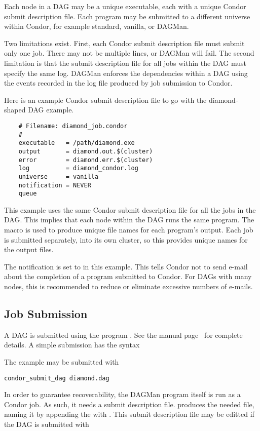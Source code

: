 Each node in a DAG may be a unique executable, each with a unique
Condor submit description file.
Each program may be submitted to a different universe
within Condor, for example standard,
vanilla, or DAGMan.

Two limitations exist.
First, each Condor submit description file must submit only one job.
There may not be multiple \verb@queue@ lines, or DAGMan will fail.
The second limitation is that
the submit description file for all jobs within the DAG
must specify the same log.
DAGMan enforces the dependencies within a DAG
using the events recorded in the
log file produced by job submission to Condor.

Here is an example Condor submit description file to go with the
diamond-shaped DAG example.

\begin{verbatim}
	# Filename: diamond_job.condor
	#
	executable   = /path/diamond.exe
	output       = diamond.out.$(cluster)
	error        = diamond.err.$(cluster)
	log          = diamond_condor.log
	universe     = vanilla
	notification = NEVER
	queue
\end{verbatim}

This example uses the same Condor submit description file
for all the jobs in the DAG.
This implies that each node within the DAG runs the
same program.
The  macro
is used to produce unique file names for each program's output.
Each job is submitted separately, into its own cluster,
so this provides unique names for the output files.

The notification is set to \verb@NEVER@ in this example.
This tells Condor not to send e-mail about the completion of a program
submitted to Condor.
For DAGs with many nodes, this is recommended
to reduce or eliminate excessive numbers of e-mails.

\subsection{\label{dagman:submitdag}Job Submission}

A DAG is submitted using the program .
See the manual
page~\pageref{man-condor-submit}
for complete details.
A simple submission has the syntax

 

The example may be submitted with

\begin{verbatim}
condor_submit_dag diamond.dag
\end{verbatim}
In order to guarantee recoverability, the DAGMan program itself
is run as a Condor job.
As such, it needs a submit description file.
 produces the needed file,
naming it by appending the  with
.
This submit description file may be editted if the DAG is
submitted with

